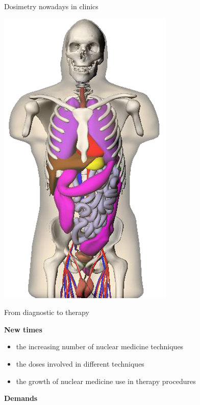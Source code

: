 \documentclass[ignorenonframetext,]{beamer}
\begin{document}
\begin{frame}{Dosimetry nowadays in clinics}
\begin{center}
\includegraphics[height=.6\textheight]{imgs/phantom2.png}
\end{center}

\end{frame}

\begin{frame}{From diagnostic to therapy}
\protect\hypertarget{from-diagnostic-to-therapy}{}

\textbf{New times}

\begin{itemize}
\item
  the increasing number of nuclear medicine techniques
\item
  the doses involved in different techniques
\item
  the growth of nuclear medicine use in therapy procedures
\end{itemize}

\vspace{.5cm}

\textbf{Demands} \vspace{.3cm}

\begin{center}
\end{center}

\end{frame}
\end{document}
